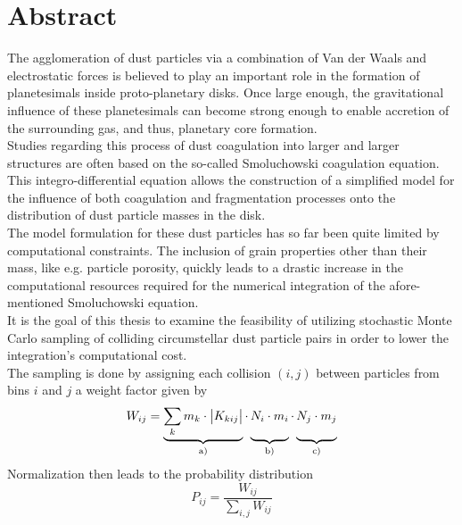 \chapter*{Abstract}

\thispagestyle{NoHeader}

The agglomeration of dust particles via a combination of Van der Waals and electrostatic forces
is believed to play an important role in the formation of planetesimals inside proto-planetary 
disks. Once large enough, the gravitational influence of these planetesimals can become strong 
enough to enable accretion of the surrounding gas, and thus, planetary core formation. \\

Studies regarding this process of dust coagulation into larger and larger structures are often 
based on the so-called Smoluchowski coagulation equation. %
This integro-differential equation allows the construction of a simplified model for the influence 
of both coagulation and fragmentation processes onto the distribution of dust particle masses in 
the disk. \\

The model formulation for these dust particles has so far been quite limited by computational 
constraints. The inclusion of grain properties other than their mass, like e.g. particle porosity, 
quickly leads to a drastic increase in the computational resources required for the numerical 
integration of the afore-mentioned Smoluchowski equation. \\

It is the goal of this thesis to examine the feasibility of utilizing stochastic Monte Carlo 
sampling of colliding circumstellar dust particle pairs in order to lower the integration's 
computational cost. \\


The sampling is done by assigning each collision $(i,j)$ between particles from bins 
$i$ and $j$ a weight factor given by
\begin{equation}
    W_{ij}=
        \underbrace{
            \sum_k m_k\cdot\big|K_{kij}\big|
        }_\text{a)}
        \cdot
        \underbrace{
            N_i \cdot m_i
            \vphantom{\sum_k m_k\cdot\big|K_{kij}\big|}
        }_\text{b)}
        \cdot
        \underbrace{
            N_j \cdot m_j
            \vphantom{\sum_k m_k\cdot\big|K_{kij}\big|}
        }_\text{c)}
\end{equation}
Normalization then leads to the probability distribution
\begin{equation}
    P_{ij}=
        \frac{
            W_{ij}
        }{
            \sum_{i,j} W_{ij}
        }
\end{equation}

